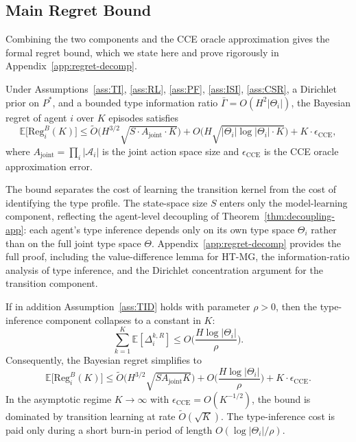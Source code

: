 \subsection{Main Regret Bound}

Combining the two components and the CCE oracle approximation gives the formal regret bound, which we state here and prove rigorously in Appendix~\ref{app:regret-decomp}.

\begin{theorem}
\label{thm:main-regret-app}
Under Assumptions~\ref{ass:TI}, \ref{ass:RL}, \ref{ass:PF}, \ref{ass:ISI}, \ref{ass:CSR}, a Dirichlet prior on $P^*$, and a bounded type information ratio $\bar{\Gamma} = O(H^2 |\Theta_i|)$, the Bayesian regret of agent $i$ over $K$ episodes satisfies
\begin{equation}
\label{eq:main-regret-sketch}
\mathbb{E}\big[\mathrm{Reg}_i^B(K)\big] \leq \tilde{O}\Big(H^{3/2}\sqrt{S \cdot A_{\mathrm{joint}} \cdot K}\Big) + O\Big(H \sqrt{|\Theta_i| \log|\Theta_i| \cdot K}\Big) + K \cdot \epsilon_{\mathrm{CCE}},
\end{equation}
where $A_{\mathrm{joint}} = \prod_i |\mathcal{A}_i|$ is the joint action space size and $\epsilon_{\mathrm{CCE}}$ is the CCE oracle approximation error.
\end{theorem}

The bound separates the cost of learning the transition kernel from the cost of identifying the type profile. The state-space size $S$ enters only the model-learning component, reflecting the agent-level decoupling of Theorem~\ref{thm:decoupling-app}: each agent's type inference depends only on its own type space $\Theta_i$ rather than on the full joint type space $\Theta$. Appendix~\ref{app:regret-decomp} provides the full proof, including the value-difference lemma for HT-MG, the information-ratio analysis of type inference, and the Dirichlet concentration argument for the transition component.

\begin{corollary}
\label{cor:gap-dependent}
If in addition Assumption~\ref{ass:TID} holds with parameter $\rho > 0$, then the type-inference component collapses to a constant in $K$:
\begin{equation}
\sum_{k=1}^K \mathbb{E}[\Delta_i^{k,R}] \leq O\bigg(\frac{H \log|\Theta_i|}{\rho}\bigg).
\end{equation}
Consequently, the Bayesian regret simplifies to
\begin{equation}
\mathbb{E}\big[\mathrm{Reg}_i^B(K)\big] \leq \tilde{O}\Big(H^{3/2}\sqrt{S A_{\mathrm{joint}} K}\Big) + O\bigg(\frac{H \log|\Theta_i|}{\rho}\bigg) + K \cdot \epsilon_{\mathrm{CCE}}.
\end{equation}
In the asymptotic regime $K \to \infty$ with $\epsilon_{\mathrm{CCE}} = O(K^{-1/2})$, the bound is dominated by transition learning at rate $\tilde{O}(\sqrt{K})$. The type-inference cost is paid only during a short burn-in period of length $O(\log|\Theta_i| / \rho)$.
\end{corollary}

